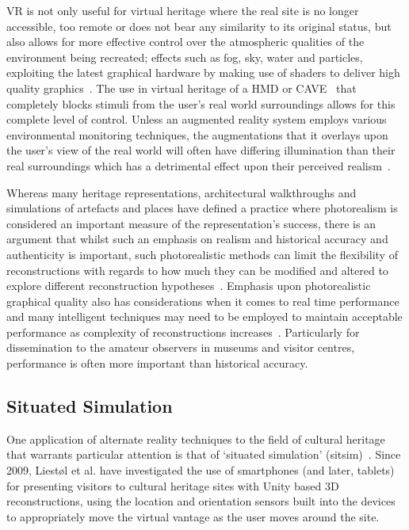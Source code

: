 VR is not only useful for virtual heritage where the real site is no longer accessible, too remote or does not bear any similarity to its original status, but also allows for more effective control over the atmospheric qualities of the environment being recreated; effects such as fog, sky, water and particles, exploiting the latest graphical hardware by making use of shaders to deliver high quality graphics~\cite{deamicis:gamebased}. The use in virtual heritage of a HMD or CAVE~\cite{cabral:x3dexperience,Christou2006} that completely blocks stimuli from the user's real world surroundings allows for this complete level of control. Unless an augmented reality system employs various environmental monitoring techniques, the augmentations that it overlays upon the user's view of the real world will often have differing illumination than their real surroundings which has a detrimental effect upon their perceived realism~\cite{mcnamara:lightness}.

Whereas many heritage representations, architectural walkthroughs and simulations of artefacts and places have defined a practice where photorealism is considered an important measure of the representation's success, there is an argument that whilst such an emphasis on realism and historical accuracy and authenticity is important, such photorealistic methods can limit the flexibility of reconstructions with regards to how much they can be modified and altered to explore different reconstruction hypotheses~\cite{roussou:photorealism}. Emphasis upon photorealistic graphical quality also has considerations when it comes to real time performance and many intelligent techniques may need to be employed to maintain acceptable performance as complexity of reconstructions increases~\cite{willmott:largecomplex}. Particularly for dissemination to the amateur observers in museums and visitor centres, performance is often more important than historical accuracy.


\subsection{Situated Simulation}
\label{situated-simulation}
One application of alternate reality techniques to the field of cultural heritage that warrants particular attention is that of `situated simulation' (sitsim)~\cite{Liestøl2009}. Since 2009, Liest\o l et al. have investigated the use of smartphones (and later, tablets) for presenting visitors to cultural heritage sites with Unity based 3D reconstructions, using the location and orientation sensors built into the devices to appropriately move the virtual vantage as the user moves around the site.

